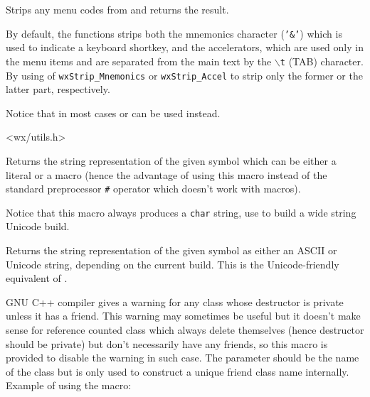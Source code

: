 
Strips any menu codes from  and returns the result.

By default, the functions strips both the mnemonics character (\texttt{'\&'})
which is used to indicate a keyboard shortkey, and the accelerators, which are
used only in the menu items and are separated from the main text by the
\texttt{$\backslash$t} (TAB) character. By using  of
\texttt{wxStrip\_Mnemonics} or \texttt{wxStrip\_Accel} to strip only the former
or the latter part, respectively.

Notice that in most cases
 or
 can be used instead.


<wx/utils.h>


\label{wxstringize}


Returns the string representation of the given symbol which can be either a
literal or a macro (hence the advantage of using this macro instead of the
standard preprocessor \texttt{\#} operator which doesn't work with macros).

Notice that this macro always produces a \texttt{char} string, use 
 to build a wide string Unicode build.




\label{wxstringizet}


Returns the string representation of the given symbol as either an ASCII or
Unicode string, depending on the current build. This is the Unicode-friendly
equivalent of .


\label{wxsuppressgccprivatedtorwarning}


GNU C++ compiler gives a warning for any class whose destructor is private
unless it has a friend. This warning may sometimes be useful but it doesn't
make sense for reference counted class which always delete themselves (hence
destructor should be private) but don't necessarily have any friends, so this
macro is provided to disable the warning in such case. The  parameter
should be the name of the class but is only used to construct a unique friend
class name internally. Example of using the macro:

